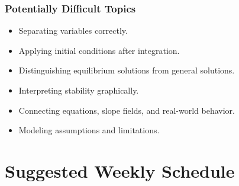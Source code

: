 \documentclass[11pt]{article}
\begin{document}
\subsubsection*{Potentially Difficult Topics}

\begin{itemize}
    \item Separating variables correctly.
    \item Applying initial conditions after integration.
    \item Distinguishing equilibrium solutions from general solutions.
    \item Interpreting stability graphically.
    \item Connecting equations, slope fields, and real-world behavior.
    \item Modeling assumptions and limitations.
\end{itemize}

\section{Suggested Weekly Schedule}
\end{document}
